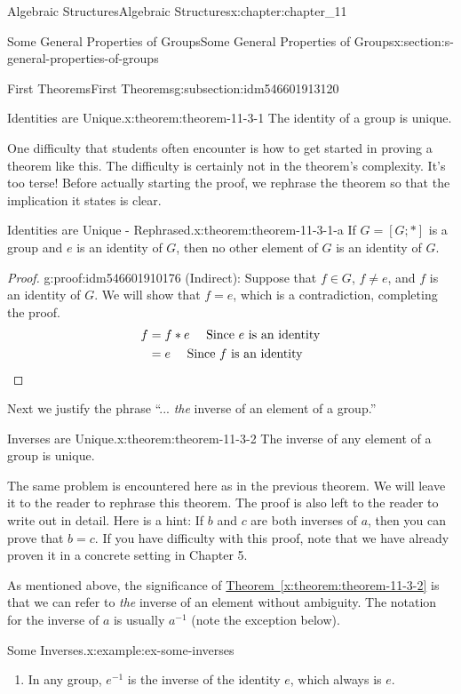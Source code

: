 \documentclass[oneside,10pt,]{book}
\newcommand{\xreffont}{\relax}
\newcommand{\qedhere}{\relax}
\numberwithin{equation}{section}
\begin{document}
\begin{chapterptx}{Algebraic Structures}{}{Algebraic Structures}{}{}{x:chapter:chapter_11}
\begin{sectionptx}{Some General Properties of Groups}{}{Some General Properties of Groups}{}{}{x:section:s-general-properties-of-groups}
\begin{subsectionptx}{First Theorems}{}{First Theorems}{}{}{g:subsection:idm546601913120}
\begin{theorem}{Identities are Unique.}{}{x:theorem:theorem-11-3-1}
The identity of a group is unique.%
\end{theorem}
One difficulty that students often encounter is how to get started in proving a theorem like this. The difficulty is certainly not in the theorem's complexity. It's too terse! Before actually starting the proof, we rephrase the theorem so that the implication it states is clear.%
\begin{theorem}{Identities are Unique - Rephrased.}{}{x:theorem:theorem-11-3-1-a}%
If \(G= [G; *]\) is a group and \(e\) is an identity of \(G\), then no other element of \(G\) is an identity of \(G\).%
\end{theorem}
\begin{proof}{}{g:proof:idm546601910176}
(Indirect): Suppose that \(f\in  G\), \(f\neq e\), and \(f\) is an identity of \(G\). We will show that \(f = e\), which is a contradiction, completing the proof.%
\begin{equation*}
\begin{split}
f  &= f * e \quad \textrm{  Since }e\textrm{ is an identity}\\
&= e  \quad \textrm{  Since }f\textrm{ is an identity}
\end{split}\qedhere
\end{equation*}
%
\end{proof}
Next we justify the phrase ``... \emph{the} inverse of an element of a group.''%
\begin{theorem}{Inverses are Unique.}{}{x:theorem:theorem-11-3-2}%
The inverse of any element of a group is unique.%
\end{theorem}
The same problem is encountered here as in the previous theorem. We will leave it to the reader to rephrase this theorem. The proof is also left to the reader to write out in detail. Here is a hint: If \(b\) and \(c\) are both inverses of \(a\), then you can prove that \(b = c\).  If you have difficulty with this proof, note that we have already proven it in a concrete setting in Chapter 5.%
\par
As mentioned above, the significance of \hyperref[x:theorem:theorem-11-3-2]{Theorem~{\xreffont\ref{x:theorem:theorem-11-3-2}}} is that we can refer to \emph{the} inverse of an element without ambiguity. The notation for the inverse of \(a\) is usually \(a^{-1}\) (note the exception below).%
\begin{example}{Some Inverses.}{x:example:ex-some-inverses}%
%
\begin{enumerate}[label=(\alph*)]
\item{}In any group, \(e^{-1}\) is the inverse of the identity \(e\), which always is \(e\).%

\end{enumerate}
\end{example}
\end{subsectionptx}
\end{sectionptx}
\end{chapterptx}
\end{document}
